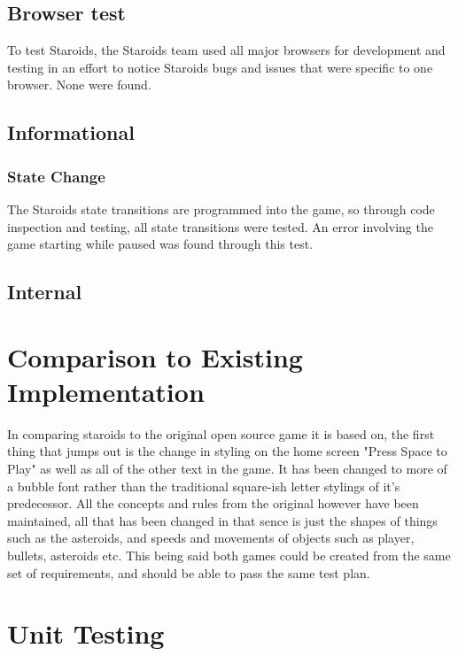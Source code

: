 \documentclass[12pt, titlepage]{article}
\begin{document}
\subsection{Browser test}
To test Staroids, the Staroids team used all major browsers for development and testing in an effort to notice Staroids bugs and issues that were specific to one browser. None were found.\\

\subsection{Informational}

\subsubsection{State Change}
The Staroids state transitions are programmed into the game, so through code inspection and testing, all state transitions were tested. An error involving the game starting while paused was found through this test.

\subsection{Internal}

\section{Comparison to Existing Implementation}

In comparing staroids to the original open source game it is based on, the first thing that jumps out is the change in styling on the home screen "Press Space to Play" as well as all of the other text in the game. It has been changed to more of a bubble font rather than the traditional square-ish letter stylings of it's predecessor. All the concepts and rules from the original however have been maintained, all that has been changed in that sence is just the shapes of things such as the asteroids, and speeds and movements of objects such as player, bullets, asteroids etc. This being said both games could be created from the same set of requirements, and should be able to pass the same test plan.

\section{Unit Testing}
\end{document}
